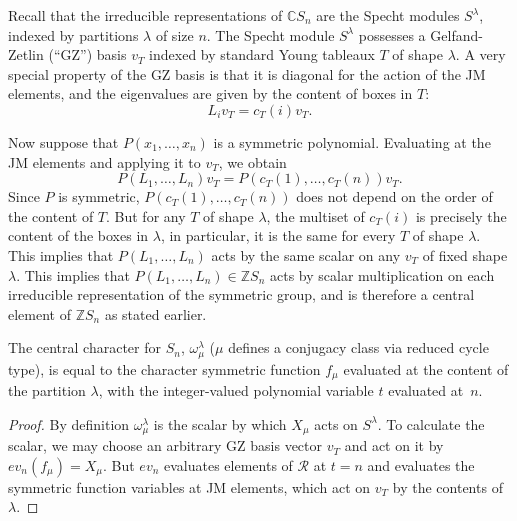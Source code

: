 \documentclass[ALCO,Unicode]{cedram}
\begin{document}
Recall that the irreducible representations of $\mathbb{C}S_n$ are the Specht modules $S^\lambda$, indexed by partitions $\lambda$ of size $n$. The Specht module $S^\lambda$ possesses a Gelfand-Zetlin (``GZ'') basis $v_T$ indexed by standard Young tableaux $T$ of shape $\lambda$. A very special property of the GZ basis is that it is diagonal for the action of the JM elements, and the eigenvalues are given by the content of boxes in $T$:
\[
L_i v_T = c_T(i) v_T.
\]

Now suppose that $P(x_1, \ldots, x_n)$ is a symmetric polynomial. Evaluating at the JM elements and applying it to $v_T$, we obtain
\[
P(L_1, \ldots, L_n)v_T = P(c_T(1), \ldots, c_T(n))v_T.
\]
Since $P$ is symmetric, $P(c_T(1), \ldots, c_T(n))$ does not depend on the order of the content of $T$. But for any $T$ of shape $\lambda$, the multiset of $c_T(i)$ is precisely the content of the boxes in $\lambda$, in particular, it is the same for every $T$ of shape $\lambda$. This implies that $P(L_1, \ldots, L_n)$ acts by the same scalar on any $v_T$ of fixed shape $\lambda$. This implies that $P(L_1, \ldots, L_n) \in \mathbb{Z}S_n$ acts by scalar multiplication on each irreducible representation of the symmetric group, and is therefore a central element of $\mathbb{Z}S_n$ as stated earlier.

\begin{theorem} \label{sym_gp_eval_thm}
The central character for $S_n$, $\omega_\mu^\lambda$ \textup{(}$\mu$ defines a conjugacy class via reduced cycle type\textup{)}, is equal to the character symmetric function $f_\mu$ evaluated at the content of the partition $\lambda$, with the integer-valued polynomial variable $t$ evaluated at~$n$.
\end{theorem}
\begin{proof}
By definition $\omega_\mu^\lambda$ is the scalar by which $X_\mu$ acts on $S^\lambda$. To calculate the scalar, we may choose an arbitrary GZ basis vector $v_T$ and act on it by $ev_n(f_\mu) = X_\mu$. But $ev_n$ evaluates elements of $\mathcal{R}$ at $t=n$ and evaluates the symmetric function variables at JM elements, which act on $v_T$ by the contents of $\lambda$.
\end{proof}
\end{document}
